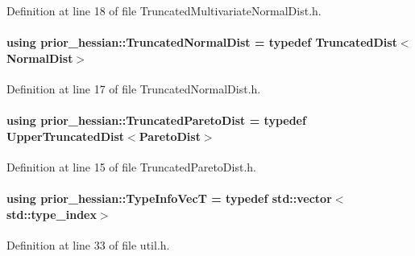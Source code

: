 Definition at line 18 of file Truncated\+Multivariate\+Normal\+Dist.\+h.

\paragraph[{\texorpdfstring{Truncated\+Normal\+Dist}{TruncatedNormalDist}}]{\setlength{\rightskip}{0pt plus 5cm}using {\bf prior\+\_\+hessian\+::\+Truncated\+Normal\+Dist} = typedef {\bf Truncated\+Dist}$<${\bf Normal\+Dist}$>$}\hypertarget{namespaceprior__hessian_a47f38d4bb5d31fd3f01f5eb6ba6f1223}{}\label{namespaceprior__hessian_a47f38d4bb5d31fd3f01f5eb6ba6f1223}


Definition at line 17 of file Truncated\+Normal\+Dist.\+h.

\paragraph[{\texorpdfstring{Truncated\+Pareto\+Dist}{TruncatedParetoDist}}]{\setlength{\rightskip}{0pt plus 5cm}using {\bf prior\+\_\+hessian\+::\+Truncated\+Pareto\+Dist} = typedef {\bf Upper\+Truncated\+Dist}$<${\bf Pareto\+Dist}$>$}\hypertarget{namespaceprior__hessian_afebdccc7e1a35836f660f8a301af9cb2}{}\label{namespaceprior__hessian_afebdccc7e1a35836f660f8a301af9cb2}


Definition at line 15 of file Truncated\+Pareto\+Dist.\+h.

\paragraph[{\texorpdfstring{Type\+Info\+VecT}{TypeInfoVecT}}]{\setlength{\rightskip}{0pt plus 5cm}using {\bf prior\+\_\+hessian\+::\+Type\+Info\+VecT} = typedef std\+::vector$<$std\+::type\+\_\+index$>$}\hypertarget{namespaceprior__hessian_acfdf544db12888f88bafb2e671841352}{}\label{namespaceprior__hessian_acfdf544db12888f88bafb2e671841352}


Definition at line 33 of file util.\+h.

